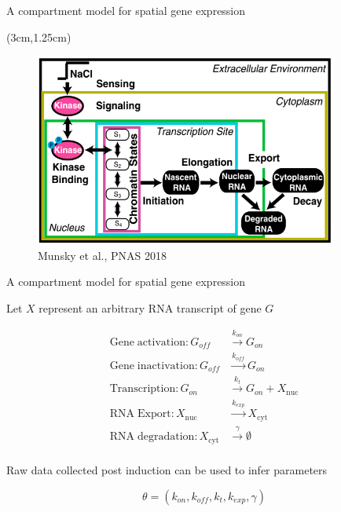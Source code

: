 \documentclass[aspectratio=1610]{beamer}					%
\begin{document}
\begin{frame}{A compartment model for spatial gene expression}
\begin{textblock*}{10cm}(3cm,1.25cm)
\begin{figure}
\includegraphics[width=10cm]{compartment.png}
\caption{Munsky et al., PNAS 2018}
\end{figure}
\end{textblock*}
\end{frame}

\begin{frame}{A compartment model for spatial gene expression}

Let $X$ represent an arbitrary RNA transcript of gene $G$

\begin{align*}
\mathrm{Gene\;activation}: G_{off} &\overset{k_{on}}{\rightarrow} G_{on}\\
\mathrm{Gene\;inactivation}: G_{off} &\overset{k_{off}}{\rightarrow} G_{on}\\
\mathrm{Transcription}: G_{on} &\overset{k_{t}}{\rightarrow} G_{on} + X_{\mathrm{nuc}}\\
\mathrm{RNA \;Export}: X_{\mathrm{nuc}} &\overset{k_{exp}}{\rightarrow} X_{\mathrm{cyt}}\\
\mathrm{RNA\; degradation}: X_{\mathrm{cyt}} &\overset{\gamma}{\rightarrow} \emptyset\\
\end{align*}

Raw data collected post induction can be used to infer parameters

\begin{equation*}
\theta = \left( k_{on},k_{off},k_{t},k_{exp},\gamma\right)
\end{equation*}

\end{frame}
\end{document}
